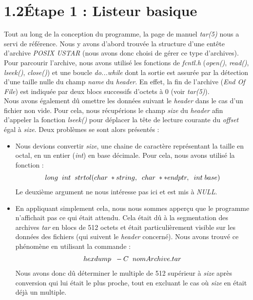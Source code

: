 \documentclass[12pt, a4paper]{report}
\begin{document}
\section*{\hspace{0.6cm}1.2\hspace{0.6cm}Étape 1 : Listeur basique}
\hspace{1cm}Tout au long de la conception du programme, la page de manuel \textit{tar(5)} nous a servi de référence. Nous y avons d'abord trouvée la structure d'une entête d'archive \textit{POSIX USTAR} (nous avons donc choisi de gérer ce type d'archives). \\

\hspace{0.5cm}Pour parcourir l'archive, nous avons utilisé les fonctions de \textit{fcntl.h} (\textit{open()}, \textit{read()}, \textit{lseek()}, \textit{close()}) et une boucle \textit{do...while} dont la sortie est assurée par la détection d'une taille nulle du champ \textit{name} du \textit{header}. En effet, la fin de l'archive (\textit{End Of File}) est indiquée par deux blocs successifs d'octets à 0 (voir \textit{tar(5)}). \\

\hspace{0.5cm}Nous avons également dû omettre les données suivant le \textit{header} dans le cas d'un fichier non vide. Pour cela, nous récupérions le champ \textit{size} du \textit{header} afin d'appeler la fonction \textit{lseek()} pour déplacer la tête de lecture courante du \textit{offset} égal à \textit{size}. Deux problèmes se sont alors présentés : 
\begin{itemize}
\item \hspace{0.2cm}Nous devions convertir \textit{size}, une chaine de caractère représentant la taille en octal, en un entier (\textit{int}) en base décimale. Pour cela, nous avons utilisé la fonction : \[long\hspace{0.2cm}int\hspace{0.2cm}strtol(char\hspace{0.1cm}*string,\hspace{0.2cm}char\hspace{0.1cm}**endptr,\hspace{0.2cm}int\hspace{0.1cm}base)\]Le deuxième argument ne nous intéresse pas ici et est mis à \textit{NULL}.
\item \hspace{0.2cm}En appliquant simplement cela, nous nous sommes apperçu que le programme n'affichait pas ce qui était attendu. Cela était dû à la segmentation des archives \textit{tar} en blocs de 512 octets et était particulièrement visible sur les données des fichiers (qui suivent le \textit{header} concerné). Nous avons trouvé ce phénomène en utilisant la commande : \[hexdump\hspace{0.2cm}-C\hspace{0.2cm}nomArchive.tar\] Nous avons donc dû déterminer le multiple de 512 supérieur à \textit{size} après conversion qui lui était le plus proche, tout en excluant le cas où \textit{size} en était déjà un multiple.
\end{itemize}
\end{document}
